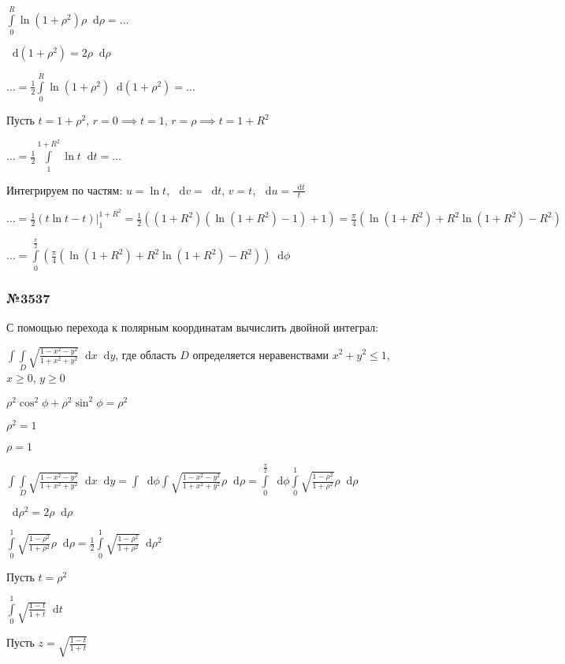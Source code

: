 \documentclass{article}
\newcommand*\diff{\mathop{}\!\mathrm{d}}
\begin{document}
$\int\limits_{0}^{R} \ln (1 + \rho^2) \rho \diff \rho = \dots$

$\diff (1 + \rho^2) = 2\rho \diff \rho$

$\dots = \frac{1}{2} \int\limits_{0}^{R} \ln (1 + \rho^2) \diff (1 + \rho^2) = \dots$

Пусть $t = 1 + \rho^2$, $r = 0 \implies t = 1$, $r = \rho \implies t = 1 + R^2$

$\dots = \frac{1}{2} \int\limits_{1}^{1 + R^2} \ln t \diff t = \dots$

Интегрируем по частям: $u = \ln t$, $\diff v = \diff t$, $v = t$, $\diff u = \frac{\diff t}{t}$

$\dots = \frac{1}{2} (t \ln t - t) \bigg|_{1}^{1 + R^2} = \frac{1}{2} ((1 + R^2)(\ln(1+R^2) - 1) + 1) = \frac{\pi}{4} (\ln(1+R^2) + R^2 \ln(1 + R^2) - R^2)$

$\dots = \int\limits_{0}^{\frac{\pi}{2}} (\frac{\pi}{4} (\ln(1+R^2) + R^2 \ln(1 + R^2) - R^2)) \diff \phi $

\subsubsection{№3537}

С помощью перехода к полярным координатам вычислить двойной интеграл:

$\int\int\limits_{D} \sqrt{\frac{1 - x^2 - y^2}{1 + x^2 + y^2}} \diff x \diff y$, где область $D$ определяется неравенствами $x^2 + y^2 \le 1$, $x \ge 0$, $y \ge 0$

$\rho^2 \cos^2 \phi + \rho^2 \sin^2 \phi = \rho^2$

$\rho^2 = 1$

$\rho = 1$

$\int\int\limits_{D} \sqrt{\frac{1 - x^2 - y^2}{1 + x^2 + y^2}} \diff x \diff y = \int\limits_{}^{} \diff \phi \int\limits_{}^{} \sqrt{\frac{1 - x^2 - y^2}{1 + x^2 + y^2}} \rho \diff \rho = \int\limits_{0}^{\frac{\pi}{2}} \diff \phi \int\limits_{0}^{1} \sqrt{\frac{1 - \rho^2}{1 + \rho^2}} \rho \diff \rho$

$\diff \rho^2 = 2 \rho \diff \rho$

$\int\limits_{0}^{1} \sqrt{\frac{1-\rho^2}{1+\rho^2}} \rho \diff \rho = \frac{1}{2} \int\limits_{0}^{1} \sqrt{\frac{1 - \rho^2}{1 + \rho^2}} \diff \rho^2$

Пусть $t = \rho^2$

$\int\limits_{0}^{1} \sqrt{\frac{1 - t}{1 + t}} \diff t$

Пусть $z = \sqrt{\frac{1 - t}{1 + t}}$
\end{document}

